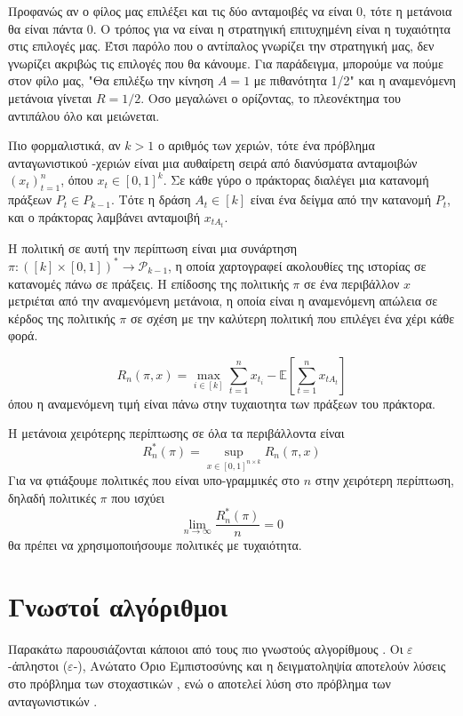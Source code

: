 Προφανώς αν ο φίλος μας επιλέξει και τις δύο ανταμοιβές να είναι 0, τότε η μετάνοια θα είναι πάντα 0. Ο τρόπος για να είναι η στρατηγική επιτυχημένη είναι η τυχαιότητα στις επιλογές μας. Έτσι παρόλο που ο αντίπαλος γνωρίζει την στρατηγική μας, δεν γνωρίζει ακριβώς τις επιλογές που θα κάνουμε. Για παράδειγμα, μπορούμε να πούμε στον φίλο μας, "Θα επιλέξω την κίνηση $A=1$ με πιθανότητα 1/2" και η αναμενόμενη μετάνοια γίνεται $R=1/2$.  Οσο μεγαλώνει ο ορίζοντας, το πλεονέκτημα του αντιπάλου όλο και μειώνεται.

Πιο φορμαλιστικά, αν $k>1$ ο αριθμός των χεριών, τότε ένα πρόβλημα ανταγωνιστικού  -χεριών είναι μια αυθαίρετη σειρά από διανύσματα ανταμοιβών $(x_t)_{t=1}^n$, όπου $x_t \in [0,1]^k$. Σε κάθε γύρο ο πράκτορας διαλέγει μια κατανομή πράξεων $P_t \in P_{k-1}$. Τότε η δράση $A_t \in [k]$ είναι ένα δείγμα από την κατανομή $P_t$, και ο πράκτορας λαμβάνει ανταμοιβή $x_{tA_t}$.

Η πολιτική σε αυτή την περίπτωση είναι μια συνάρτηση $π: ([k] \times [0,1])^* \rightarrow \mathcal{P}_{k-1}$, η οποία χαρτογραφεί ακολουθίες της ιστορίας σε κατανομές πάνω σε πράξεις.
Η επίδοσης της πολιτικής $π$ σε ένα περιβάλλον $x$ μετριέται από την αναμενόμενη μετάνοια, η οποία είναι η αναμενόμενη απώλεια σε κέρδος της πολιτικής $π$ σε σχέση με την καλύτερη πολιτική που επιλέγει ένα χέρι κάθε φορά.

\begin{equation}
    R_n(π,x) = \max_{i \in [k]} \sum_{t=1}^n x_{t_i} - \mathbb{E}\left[\sum_{t=1}^n x_{tA_t}\right]
\end{equation}
όπου η αναμενόμενη τιμή είναι πάνω στην τυχαιοτητα των πράξεων του πράκτορα.

Η μετάνοια χειρότερης περίπτωσης σε όλα τα περιβάλλοντα είναι
\begin{equation*}
    R_n^*(π) =  \sup_{x \in [0,1]^{n \times k}} R_n(π,x)
\end{equation*}
Για να φτιάξουμε πολιτικές που είναι υπο-γραμμικές στο $n$ στην χειρότερη περίπτωση, δηλαδή πολιτικές $π$ που ισχύει
\begin{equation*}
    \lim_{n \to \infty} \frac{R^*_n(π)}{n} = 0
\end{equation*}
θα πρέπει να χρησιμοποιήσουμε πολιτικές με τυχαιότητα.

\section{Γνωστοί αλγόριθμοι}

Παρακάτω παρουσιάζονται κάποιοι από τους πιο γνωστούς αλγορίθμους . Οι $ε$-άπληστοι ($ε$-), Ανώτατο Όριο Εμπιστοσύνης  και η δειγματοληψία  αποτελούν λύσεις στο πρόβλημα των στοχαστικών , ενώ ο  αποτελεί λύση στο πρόβλημα των ανταγωνιστικών .

